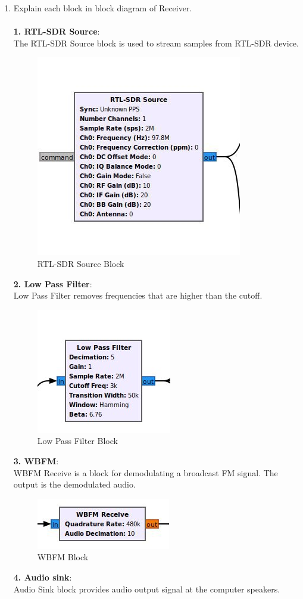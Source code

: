 \begin{enumerate}[label=\arabic*.,ref=\thesection.\theenumi]
\item Explain each block in block diagram of Receiver.\\
	\solution \\
\textbf{1. RTL-SDR Source}:\\
The RTL-SDR Source block is used to stream samples from RTL-SDR device.
\begin{figure}[H]
\centering
\includegraphics[width=0.4\columnwidth]{fm/rx/figs/source_block.png}
\caption{RTL-SDR Source Block}
\label{fig:source block}
\end{figure}
\textbf{2. Low Pass Filter}:\\
Low Pass Filter removes frequencies that are higher than the cutoff.
\begin{figure}[H]
\centering
\includegraphics[width=0.3\columnwidth]{fm/rx/figs/lpf_block.png}
\caption{Low Pass Filter Block}
\label{fig:lpf}
\end{figure}
\textbf{3. WBFM}:\\
WBFM Receive is a block for demodulating a broadcast FM signal. The output is the demodulated audio.
\begin{figure}[H]
\centering
\includegraphics[width=0.3\columnwidth]{fm/rx/figs/wbfm_block.png}
\caption{WBFM Block}
\label{fig:wbfm block}
\end{figure}
\textbf{4. Audio sink}:\\
Audio Sink block provides audio output signal at the computer speakers.

\end{enumerate}

